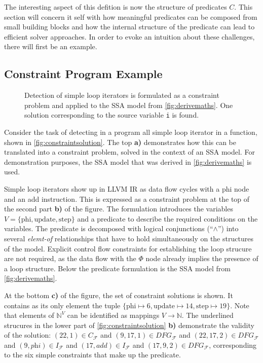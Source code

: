     The interesting aspect of this defition is now the structure of predicates
    $C$.
    This section will concern it self with how meaningful predicates can be
    composed from small building blocks and how the internal structure of the
    predicate can lead to efficient solver approaches.
    In order to evoke an intuition about these challenges, there will first be
    an example.

\subsection{Constraint Program Example}

\begin{figure}[p]
    
\caption{Detection of simple loop iterators is formulated as a constraint
         problem and applied to the SSA model from \autoref{fig:derivemaths}.
         One solution corresponding to the source variable {\tt i} is found.}
\label{fig:constraintsolution}
\end{figure}

    Consider the task of detecting in a program all simple loop iterator in a
    function, shown in \autoref{fig:constraintsolution}.
    The top {\bf a)} demonstrates how this can be translated into a constraint
    problem, solved in the context of an SSA model.
    For demonstration purposes, the SSA model that was derived in
    \autoref{fig:derivemaths} is used.

    Simple loop iterators show up in LLVM IR as data flow cycles with a phi node
    and an add instruction.
    This is expressed as a constraint problem at the top of the second part
    {\bf b)} of the figure.
    The formulation introduces the variables
    $V=\{\text{phi}, \text{update}, \text{step}\}$ and a predicate to
    describe the required conditions on the variables.
    The predicate is decomposed with logical conjunctions (``$\land$'') into
    several {\em elemt-of} relationships that have to hold simultaneously on the
    structures of the model.
    Explicit control flow constraints for establishing the loop strucure are not
    required, as the data flow with the $\Phi$ node already implies the presence
    of a loop structure.
    Below the predicate formulation is the SSA model from
    \autoref{fig:derivemaths}.

    At the bottom {\bf c)} of the figure, the set of constraint solutions is
    shown.
    It contains as its only element the tuple
    $\{\text{phi}\mapsto6,\text{update}\mapsto14,\text{step}\mapsto19\}$.
    Note that elements of $\mathbb N^V$ can be identified as mappings
    $V\rightarrow\mathbb N$.
    The underlined strucures in the lower part of
    \autoref{fig:constraintsolution} {\bf b)} demonstrate the validity of the
    solution:
    $(22,1)\in C_\mathcal F$ and $(9,17,1)\in DFG_\mathcal F$ and
    $(22,17,2)\in DFG_\mathcal F$ and $(9,\textit{phi})\in I_\mathcal F$ and
    $(17,\textit{add})\in I_\mathcal F$ and $(17,9,2)\in DFG_\mathcal F$,
    corresponding to the six simple constraints that make up the predicate.

